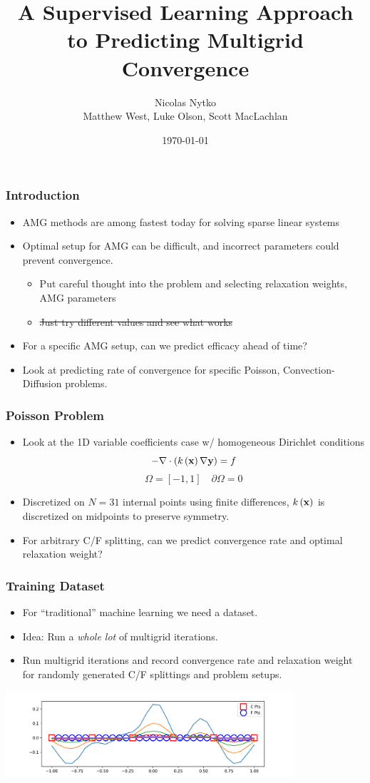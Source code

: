 \documentclass[handout]{beamer}
\title{A Supervised Learning Approach to Predicting Multigrid Convergence}
\author[N. Nytko]{Nicolas Nytko\\[3mm]Matthew West, Luke Olson, Scott MacLachlan}
\date{\today}
\renewcommand{\vec}[1]{ {\bf #1} }
\begin{document}
\frame{\titlepage}


\begin{frame}
  \frametitle{Introduction}
  \begin{itemize}
  \item AMG methods are among fastest today for solving sparse linear systems
  \item Optimal setup for AMG can be difficult, and incorrect parameters could prevent convergence.
    \begin{itemize}
      \item Put careful thought into the problem and selecting relaxation weights, AMG parameters
      \item \st{Just try different values and see what works}
    \end{itemize}
  \item For a specific AMG setup, can we predict efficacy ahead of time?
  \item Look at predicting rate of convergence for specific Poisson, Convection-Diffusion problems.
  \end{itemize}
\end{frame}


\begin{frame}
  \frametitle{Poisson Problem}
  \begin{itemize}
  \item Look at the 1D variable coefficients case w/ homogeneous Dirichlet conditions
    \[ -\nabla \cdot \left(k\left(\vec{x}\right) \nabla \vec{y} \right) = f \]
    \[ \Omega = \left[-1, 1\right] \quad \partial\Omega = 0 \]
  \item Discretized on $N=31$ internal points using finite differences, $k\left(\vec{x}\right)$ is discretized on midpoints to preserve symmetry.
  \item For arbitrary C/F splitting, can we predict convergence rate and optimal relaxation weight?
  \end{itemize}
\end{frame}


\begin{frame}
  \frametitle{Training Dataset}
  \begin{itemize}
  \item For ``traditional'' machine learning we need a dataset.
    \pause
  \item Idea: Run a \textit{whole lot} of multigrid iterations.
    \pause
  \item Run multigrid iterations and record convergence rate and relaxation weight for randomly generated C/F splittings and problem setups.
  \end{itemize}
  \begin{center}
    \includegraphics[width=0.8\textwidth]{figures/multigrid.png}
  \end{center}
\end{frame}
\end{document}
